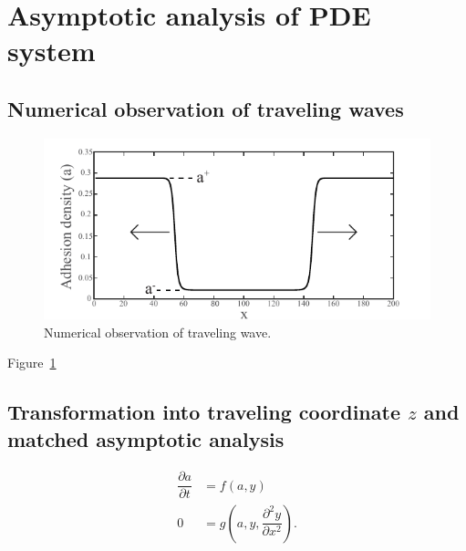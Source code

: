 \section{Asymptotic analysis of PDE system}

\subsection{Numerical observation of traveling waves}

\begin{figure}[htbp]
  \centering
  \label{fig:numericalTWave}\includegraphics[width=13cm]{figs/figawave.pdf}
  \caption{Numerical observation of traveling wave.}
\end{figure}
Figure~\ref{fig:numericalTWave}


\subsection{Transformation into traveling coordinate $z$ and matched asymptotic analysis}


\begin{align}
\dfrac{\partial a}{ \partial t}  & =  f(a,y)\\
0 & =g \left(a,y,\dfrac{\partial^2 y}{\partial x^2}\right).
\end{align}

